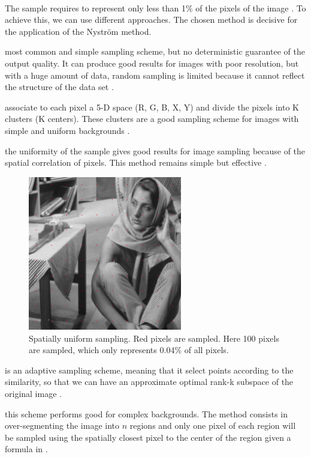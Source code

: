 \paragraph{}
The sample requires to represent only less than 1\% of the pixels of the image \cite{fowlkes_spectral_2004}.
To achieve this, we can use different approaches.
The chosen method is decisive for the application of the Nystr\"om method.
\begin{description}[align=left]
 \item [Random sampling (RS)] most common and simple sampling scheme, but no deterministic guarantee of the output quality. It can produce good results for images with poor resolution, but with a huge amount of data, random sampling is limited because it cannot reflect the structure of the data set \cite{zhan_improved_2017}.
 \item [K-means sampling (KS)] associate to each pixel a 5-D space (R, G, B, X, Y) and divide the pixels into K clusters (K centers). These clusters are a good sampling scheme for images with simple and uniform backgrounds \cite{kao_sampling_2012} \cite{zhang_improved_2008}.
 \item [Uniform spatially sampling] the uniformity of the sample gives good results for image sampling because of the spatial correlation of pixels. This method remains simple but effective \cite{glide_2014}.
  \begin{figure}[H]
      \centering
      \includegraphics[width=0.6\textwidth]{img/spatiallyUniformSampling.png}
      \caption{Spatially uniform sampling. Red pixels are sampled. Here 100 pixels are sampled, which only represents 0.04\% of all pixels.}
  \end{figure}
 \item [Incremental sampling (INS)] is an adaptive sampling scheme, meaning that it select points according to the similarity, so that we can have an approximate optimal rank-k subspace of the original image \cite{zhan_improved_2017}.
 \item [Mean-shift segmentation-based sampling] this scheme performs good for complex backgrounds. The method consists in over-segmenting the image into \(n\) regions and only one pixel of each region will be sampled using the spatially closest pixel to the center of the region given a formula in \cite{kao_sampling_2012}.
\end{description}

